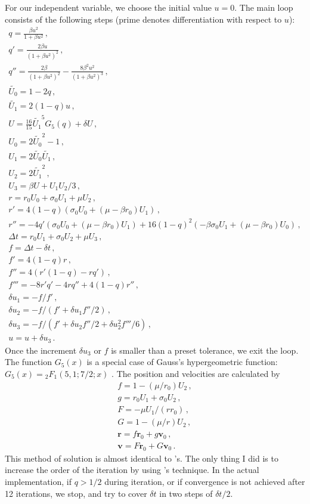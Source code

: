 \documentclass{article}
\begin{document}
For our independent variable, we choose the initial value $u=0$. The
main loop consists of the following steps (prime denotes differentiation
with respect to $u$):
\begin{gather}
q = \frac{\beta u^2}{1+\beta u^2} \,,\\
q' = \frac{2\beta u}{(1+\beta u^2)^2} \,,\\
q'' = \frac{2\beta}{(1+\beta u^2)^2} 
		  - \frac{8\beta^2 u^2}{(1+\beta u^2)^3} \,, \\
\tilde{U_0} = 1 - 2q \,,\\
\tilde{U_1} = 2(1-q)u \,,\\
U = \frac{16}{15} \tilde{U_1}^5 G_5(q) + \delta U \,,\\
U_0 = 2 \tilde{U_0}^2- 1 \,,\\
U_1 = 2 \tilde{U_0} \tilde{U_1} \,,\\
U_2 = 2 \tilde{U_1}^2 \,,\\
U_3 = \beta U + U_1 U_2 /3 \,,\\
r = r_0 U_0 + \sigma_0 U_1 + \mu U_2 \,,\\
r' =  4 (1-q) (\sigma_0 U_0 + (\mu-\beta r_0)U_1) \,,\\
r'' = -4 q' (\sigma_0 U_0 + (\mu-\beta r_0) U_1)
		       + 16 (1-q)^2  (-\beta \sigma_0 U_1 + (\mu-\beta r_0) U_0) \,,\\
\Delta t = r_0 U_1 + \sigma_0 U_2 + \mu U_3 \,,\\
f = \Delta t - \delta t \,,\\
f' = 4 (1-q) r \,,\\
f'' = 4 (r' (1-q) - r q')\,,\\
f''' = -8 r' q' - 4 r q'' + 4 (1-q) r'' \,,\\
\delta u_1  = -f/f' \,,\\
\delta u_2  = -f/(f' + \delta u_1 f''/2) \,,\\
\delta u_3  = -f/(f' + \delta u_2 f''/2 + \delta u_2^2 f'''/6) \,,\\
u = u+ \delta u_3\,.
\end{gather}
Once the increment $\delta u_3$ or $f$ is smaller than a preset
tolerance, we exit the loop.  The function $G_5(x)$ is a special case
of Gauss's hypergeometric function: $G_5(x) = {}_2F_1(5, 1; 7/2; x)$
\citep[][Ch. 15]{1972hmf..book.....A}.  The position and velocities
are calculated by
\begin{gather}
f = 1 - (\mu/ r_0) U_2 \,,\\
g = r_0 U_1 + \sigma_0 U_2   \,,\\
F = -\mu U_1/(r r_0) \,,\\
G = 1 - (\mu/r) U_2    \,,\\
\mathbf{r} = f \mathbf{r}_0 + g \mathbf{v}_0 \,,\\
\mathbf{v} = F \mathbf{r}_0 + G \mathbf{v}_0 \,.
\end{gather}
This method of solution is almost identical to \citeauthor{1985CeMec..35..129S}'s.
The only thing I did is to increase the
order of the iteration by using \citeauthor{1992fcm..book.....D}'s technique.
In the actual implementation, if $q>1/2$ during iteration, or if convergence
is not achieved after 12 iterations, we stop, and try to cover $\delta t$ in
two steps of $\delta t /2$.
\end{document}
